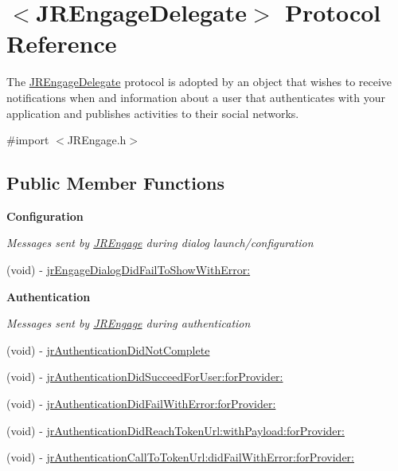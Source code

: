 \hypertarget{protocol_j_r_engage_delegate-p}{
\section{$<$JREngageDelegate$>$ Protocol Reference}
\label{protocol_j_r_engage_delegate-p}
}


The \hyperlink{protocol_j_r_engage_delegate-p}{JREngageDelegate} protocol is adopted by an object that wishes to receive notifications when and information about a user that authenticates with your application and publishes activities to their social networks.  




{\ttfamily \#import $<$JREngage.h$>$}

\subsection*{Public Member Functions}
\begin{Indent}{\bf Configuration}\par
{\em \label{_amgrp254f642527b45bc260048e30704edb39}
 Messages sent by \hyperlink{interface_j_r_engage}{JREngage} during dialog launch/configuration }\begin{DoxyCompactItemize}
\item 
(void) -\/ \hyperlink{protocol_j_r_engage_delegate-p_af46f7ef0c7a5767dc0ab705871d570ac}{jrEngageDialogDidFailToShowWithError:}
\end{DoxyCompactItemize}
\end{Indent}
\begin{Indent}{\bf Authentication}\par
{\em \label{_amgrpc75f7811d70d17dbcd88e9d03752cbed}
 Messages sent by \hyperlink{interface_j_r_engage}{JREngage} during authentication }\begin{DoxyCompactItemize}
\item 
(void) -\/ \hyperlink{protocol_j_r_engage_delegate-p_a4eaa6a5961e175b8275c6b06034afea7}{jrAuthenticationDidNotComplete}
\item 
(void) -\/ \hyperlink{protocol_j_r_engage_delegate-p_a6ac183348ebc0e858e8aad0682b5e1cd}{jrAuthenticationDidSucceedForUser:forProvider:}
\item 
(void) -\/ \hyperlink{protocol_j_r_engage_delegate-p_ac16b7db45fd324d597260dc8579b3a22}{jrAuthenticationDidFailWithError:forProvider:}
\item 
(void) -\/ \hyperlink{protocol_j_r_engage_delegate-p_abfafec7eed95008f7b7052d962f8f6fa}{jrAuthenticationDidReachTokenUrl:withPayload:forProvider:}
\item 
(void) -\/ \hyperlink{protocol_j_r_engage_delegate-p_a670eab0f76e79ba90a246a2f3e4dfe04}{jrAuthenticationCallToTokenUrl:didFailWithError:forProvider:}
\end{DoxyCompactItemize}
\end{Indent}
